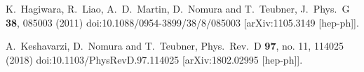 \documentclass[paper]{JHEP3}
\begin{document}
\begin{thebibliography}{10}
  K.~Hagiwara, R.~Liao, A.~D.~Martin, D.~Nomura and T.~Teubner,
  J.\ Phys.\ G {\bf 38}, 085003 (2011)
  doi:10.1088/0954-3899/38/8/085003
  [arXiv:1105.3149 [hep-ph]].
  
  A.~Keshavarzi, D.~Nomura and T.~Teubner,
  Phys.\ Rev.\ D {\bf 97}, no. 11, 114025 (2018)
  doi:10.1103/PhysRevD.97.114025
  [arXiv:1802.02995 [hep-ph]].

  
\end{thebibliography}
\end{document}
